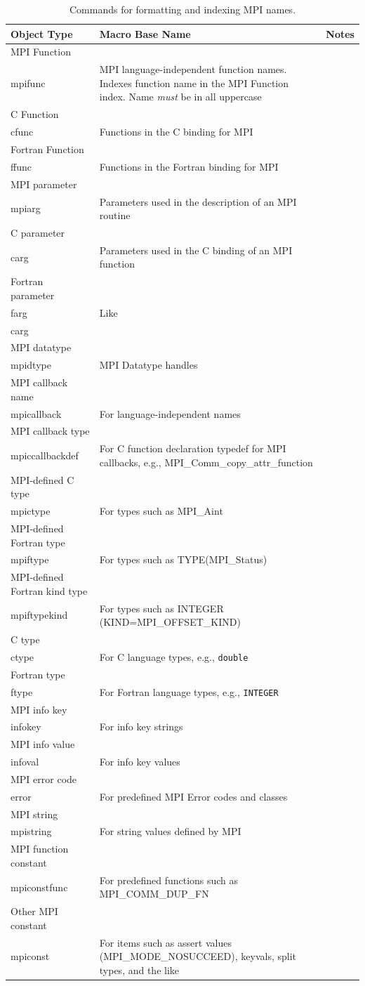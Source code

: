 \documentclass[letterpaper,twoside,11pt,fleqn]{article}
\def\cmd#1{\texttt{\char`\\#1}}
\begin{document}
\begin{table}
\caption{Commands for formatting and indexing MPI names.}
\label{tab:mpiobjects}
\begin{tabular}{>{\raggedright}p{1.5in}|l|>{\raggedright\arraybackslash}p{2.5in}}
\textbf{Object Type}&\textbf{Macro Base Name}&\textbf{Notes}\\\hline
MPI Function&\cmd{mpifunc}&MPI language-independent function
names. Indexes function name in the MPI Function index. Name
\emph{must} be in all uppercase\\
C Function &\cmd{cfunc}&Functions in the C binding for MPI\\
Fortran Function&\cmd{ffunc}&Functions in the Fortran binding for MPI\\\hline
MPI parameter&\cmd{mpiarg}&Parameters used in the description of an
MPI routine\\
C parameter&\cmd{carg}&Parameters used in the C binding of an MPI
function\\
Fortran parameter&\cmd{farg}&Like \cmd{carg}, for Fortran.\\\hline
MPI datatype&\cmd{mpidtype}&MPI Datatype handles\\
MPI callback name&\cmd{mpicallback}&For language-independent names\\
MPI callback type&\cmd{mpiccallbackdef}&For C function
declaration typedef for MPI callbacks, e.g.,
\textsf{MPI\_Comm\_copy\_attr\_function}\\
MPI-defined C type&\cmd{mpictype}&For types such as
\textsf{MPI\_Aint}\\
MPI-defined Fortran type&\cmd{mpiftype}&For types such as
\textsf{TYPE(MPI\_Status)}\\
MPI-defined Fortran kind type&\cmd{mpiftypekind}&For types such as
\textsf{INTEGER (KIND=MPI\_OFFSET\_KIND)}\\\hline
C type&\cmd{ctype}&For C language types, e.g., \texttt{double}\\
Fortran type&\cmd{ftype}&For Fortran language types, e.g.,
\texttt{INTEGER}\\\hline
MPI info key&\cmd{infokey}&For info key strings\\
MPI info value&\cmd{infoval}&For info key values\\
MPI error code&\cmd{error}&For predefined MPI Error codes and
classes\\
MPI string&\cmd{mpistring}&For string values defined by MPI\\
MPI function constant&\cmd{mpiconstfunc}&For predefined functions such as
\textsf{MPI\_COMM\_DUP\_FN}\\
Other MPI constant&\cmd{mpiconst}&For items such as assert values
(\textsf{MPI\_MODE\_NOSUCCEED}), keyvals, split types, and the like\\\hline
\end{tabular}
\end{table}
\end{document}
